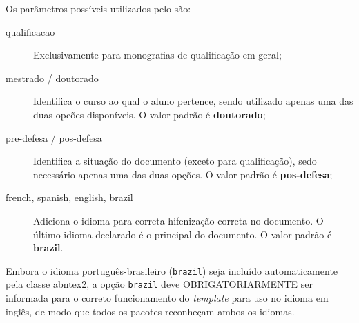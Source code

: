 Os parâmetros possíveis utilizados pelo  são:
\begin{description}
\item[qualificacao] Exclusivamente para monografias de qualificação em geral;
\item[mestrado / doutorado] Identifica o curso ao qual o aluno pertence, sendo utilizado apenas uma das duas opcões disponíveis. O valor padrão é \textbf{doutorado};
\item[pre-defesa / pos-defesa] Identifica a situação do documento (exceto para qualificação), sedo necessário apenas uma das duas opções. O valor padrão é \textbf{pos-defesa};
\item[french, spanish, english, brazil] Adiciona o idioma para correta hifenização correta no documento. O último idioma declarado é o principal do documento. O valor padrão é \textbf{brazil}.
\end{description}

{\color{red} Embora o idioma português-brasileiro (\texttt{brazil}) seja incluído automaticamente pela classe \textsf{abntex2}, a opção \texttt{brazil} deve OBRIGATORIARMENTE ser informada para o correto funcionamento do \textit{template} para uso no idioma em inglês, de modo que todos os pacotes reconheçam ambos os idiomas.}
